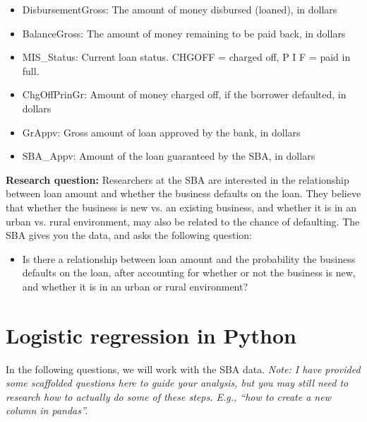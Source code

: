 \documentclass[11pt]{article}
\begin{document}
\begin{itemize}
\item DisbursementGross:	The amount of money disbursed (loaned), in dollars
\item BalanceGross: 	The amount of money remaining to be paid back, in dollars
\item MIS\_Status: 	Current loan status. CHGOFF = charged off, P I F = paid in full.
\item ChgOffPrinGr: 	Amount of money charged off, if the borrower defaulted, in dollars
\item GrAppv: 	Gross amount of loan approved by the bank, in dollars
\item SBA\_Appv: 	Amount of the loan guaranteed by the SBA, in dollars 
\end{itemize}

\noindent \textbf{Research question:} Researchers at the SBA are interested in the relationship between loan amount and whether the business defaults on the loan. They believe that whether the business is new vs. an existing business, and whether it is in an urban vs. rural environment, may also be related to the chance of defaulting. The SBA gives you the data, and asks the following question:
\begin{itemize}
\item Is there a relationship between loan amount and the probability the business defaults on the loan, after accounting for whether or not the business is new, and whether it is in an urban or rural environment?
\end{itemize}

\section*{Logistic regression in Python}

In the following questions, we will work with the SBA data. \textit{Note: I have provided some scaffolded questions here to guide your analysis, but you may still need to research \emph{how} to actually do some of these steps. E.g., \emph{``how to create a new column in pandas''}.}
\end{document}
